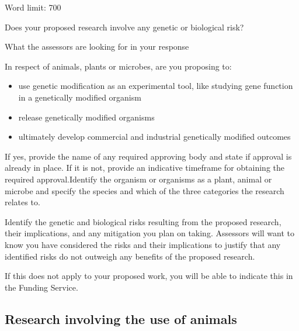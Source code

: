 \documentclass[12pt]{article}
\newenvironment{instruction}{\par\color{red}}{\par}
\begin{document}
\begin{instruction}

Word limit: 700

Does your proposed research involve any genetic or biological risk?

What the assessors are looking for in your response

In respect of animals, plants or microbes, are you proposing to:

\begin{itemize}

	\item use genetic modification as an experimental tool, like studying gene
function in a genetically modified organism

	\item release genetically modified organisms

	\item ultimately develop commercial and industrial genetically modified
outcomes

\end{itemize}

If yes, provide the name of any required approving body and state if approval
is already in place. If it is not, provide an indicative timeframe for
obtaining the required approval.Identify the organism or organisms as a plant,
animal or microbe and specify the species and which of the three categories the
research relates to.

Identify the genetic and biological risks resulting from the proposed research,
their implications, and any mitigation you plan on taking. Assessors will want
to know you have considered the risks and their implications to justify that
any identified risks do not outweigh any benefits of the proposed research.

If this does not apply to your proposed work, you will be able to indicate this
in the Funding Service.

\end{instruction}

\pagebreak
\subsection{Research involving the use of animals}
\end{document}
